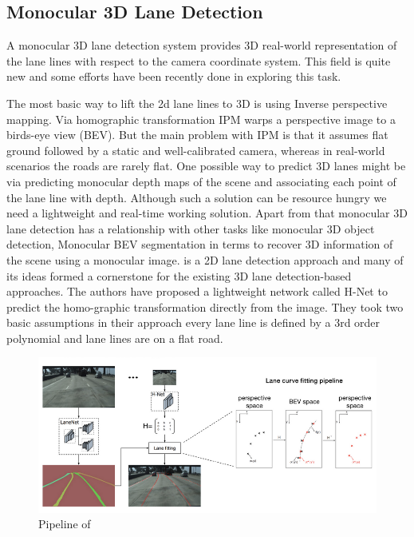         \subsection{Monocular 3D Lane Detection}
        A monocular 3D lane detection system provides 3D real-world representation of the lane lines with respect to the camera coordinate system. This field is quite new and some efforts have been recently done in exploring this task. 
 
The most basic way to lift the 2d lane lines to 3D is using Inverse perspective mapping. Via homographic transformation IPM warps a perspective image to a birds-eye view (BEV). But the main problem with IPM is that it assumes flat ground followed by a static and well-calibrated camera, whereas in real-world scenarios the roads are rarely flat. One possible way to predict 3D lanes might be via predicting monocular depth maps of the scene and associating each point of the lane line with depth. Although such a solution can be resource hungry we need a lightweight and real-time working solution. Apart from that monocular 3D lane detection has a relationship with other tasks like monocular 3D object detection, Monocular BEV segmentation in terms to recover 3D information of the scene using a monocular image.
\cite{DBLP:journals/corr/abs-1802-05591} is a 2D lane detection approach and many of its ideas formed a cornerstone for the existing 3D lane detection-based approaches. The authors have proposed a lightweight network called H-Net to predict the homo-graphic transformation directly from the image. They took two basic assumptions in their approach every lane line is defined by a 3rd order polynomial and lane lines are on a flat road. 

 \begin{figure}[h]
    \centering
    \includegraphics[width=\textwidth]{images/lanenet.png}
    \caption{Pipeline of \cite{DBLP:journals/corr/abs-1802-05591}}
    \end{figure}


